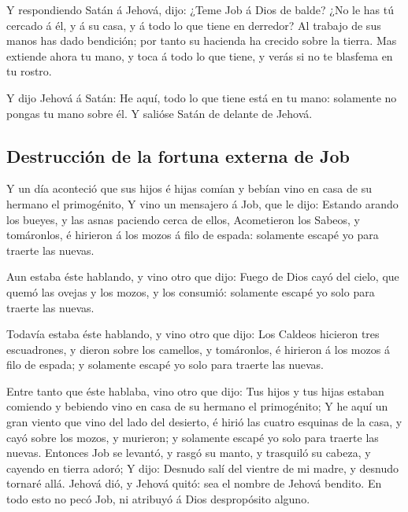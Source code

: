 Y respondiendo Satán á Jehová, dijo: ¿Teme Job á Dios de
balde?  ¿No le has tú cercado á él, y á su casa, y á todo
lo que tiene en derredor? Al trabajo de sus manos has dado bendición;
por tanto su hacienda ha crecido sobre la tierra.  Mas
extiende ahora tu mano, y toca á todo lo que tiene, y verás si no te
blasfema en tu rostro.

 Y dijo Jehová á Satán: He aquí, todo lo que tiene está
en tu mano: solamente no pongas tu mano sobre él. Y salióse Satán de
delante de Jehová.

\hypertarget{destrucciuxf3n-de-la-fortuna-externa-de-job}{%
\subsection{Destrucción de la fortuna externa de
Job}\label{destrucciuxf3n-de-la-fortuna-externa-de-job}}

 Y un día aconteció que sus hijos é hijas comían y bebían
vino en casa de su hermano el primogénito,  Y vino un
mensajero á Job, que le dijo: Estando arando los bueyes, y las asnas
paciendo cerca de ellos,  Acometieron los Sabeos, y
tomáronlos, é hirieron á los mozos á filo de espada: solamente escapé yo
para traerte las nuevas.

 Aun estaba éste hablando, y vino otro que dijo: Fuego de
Dios cayó del cielo, que quemó las ovejas y los mozos, y los consumió:
solamente escapé yo solo para traerte las nuevas.

 Todavía estaba éste hablando, y vino otro que dijo: Los
Caldeos hicieron tres escuadrones, y dieron sobre los camellos, y
tomáronlos, é hirieron á los mozos á filo de espada; y solamente escapé
yo solo para traerte las nuevas.

 Entre tanto que éste hablaba, vino otro que dijo: Tus
hijos y tus hijas estaban comiendo y bebiendo vino en casa de su hermano
el primogénito;  Y he aquí un gran viento que vino del
lado del desierto, é hirió las cuatro esquinas de la casa, y cayó sobre
los mozos, y murieron; y solamente escapé yo solo para traerte las
nuevas.  Entonces Job se levantó, y rasgó su manto, y
trasquiló su cabeza, y cayendo en tierra adoró;  Y dijo:
Desnudo salí del vientre de mi madre, y desnudo tornaré allá. Jehová
dió, y Jehová quitó: sea el nombre de Jehová bendito.  En
todo esto no pecó Job, ni atribuyó á Dios despropósito alguno.

